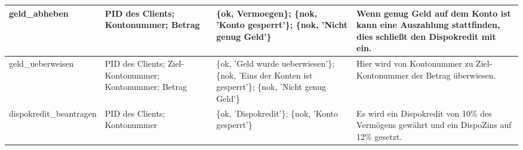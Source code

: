 \begin{center}
\begin{tabular}{p{3 cm}|p{3 cm}|p{3 cm}|p{5 cm}}
geld\_abheben & 
PID des Clients; Kontonummer; Betrag & 
\{ok, Vermoegen\}; \{nok, 'Konto gesperrt'\}; \{nok, 'Nicht genug Geld'\} & 
Wenn genug Geld auf dem Konto ist kann eine Auszahlung stattfinden, dies schließt den Dispokredit mit ein.\\ \hline

geld\_ueberweisen & 
PID des Clients; Ziel-Kontonummer; Kontonummer; Betrag & 
\{ok, 'Geld wurde ueberwiesen'\}; \{nok, 'Eins der Konten ist gesperrt'\}; \{nok, 'Nicht genug Geld'\} & 
Hier wird von Kontonummer zu Ziel-Kontonummer der Betrag überwiesen.\\ \hline

dispokredit\_beantragen & 
PID des Clients; Kontonummer & 
\{ok, 'Dispokredit'\}; \{nok, 'Konto gesperrt'\} & 
Es wird ein Dispokredit von 10\% des Vermögens gewährt und ein DispoZins auf 12\% gesetzt.\\

\end{tabular}\\
\end{center}